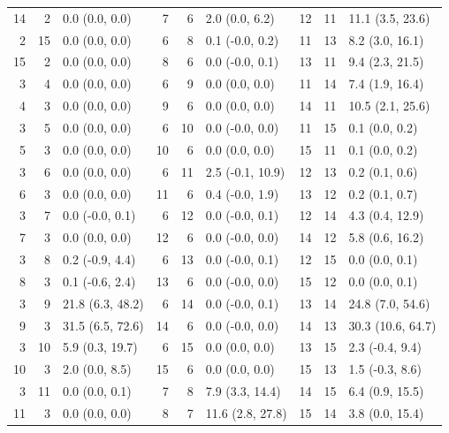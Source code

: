 \begin{table}
\begin{tabular}{|rrl||rrl||rrl|}
      14 &    2 &    0.0 (0.0, 0.0) &    7 &    6 &     2.0 (0.0, 6.2) &   12 &   11 &    11.1 (3.5, 23.6) \\
       2 &   15 &    0.0 (0.0, 0.0) &    6 &    8 &    0.1 (-0.0, 0.2) &   11 &   13 &     8.2 (3.0, 16.1) \\
      15 &    2 &    0.0 (0.0, 0.0) &    8 &    6 &    0.0 (-0.0, 0.1) &   13 &   11 &     9.4 (2.3, 21.5) \\
       3 &    4 &    0.0 (0.0, 0.0) &    6 &    9 &     0.0 (0.0, 0.0) &   11 &   14 &     7.4 (1.9, 16.4) \\
       4 &    3 &    0.0 (0.0, 0.0) &    9 &    6 &     0.0 (0.0, 0.0) &   14 &   11 &    10.5 (2.1, 25.6) \\
       3 &    5 &    0.0 (0.0, 0.0) &    6 &   10 &    0.0 (-0.0, 0.0) &   11 &   15 &      0.1 (0.0, 0.2) \\
       5 &    3 &    0.0 (0.0, 0.0) &   10 &    6 &     0.0 (0.0, 0.0) &   15 &   11 &      0.1 (0.0, 0.2) \\
       3 &    6 &    0.0 (0.0, 0.0) &    6 &   11 &   2.5 (-0.1, 10.9) &   12 &   13 &      0.2 (0.1, 0.6) \\
       6 &    3 &    0.0 (0.0, 0.0) &   11 &    6 &    0.4 (-0.0, 1.9) &   13 &   12 &      0.2 (0.1, 0.7) \\
       3 &    7 &   0.0 (-0.0, 0.1) &    6 &   12 &    0.0 (-0.0, 0.1) &   12 &   14 &     4.3 (0.4, 12.9) \\
       7 &    3 &    0.0 (0.0, 0.0) &   12 &    6 &    0.0 (-0.0, 0.0) &   14 &   12 &     5.8 (0.6, 16.2) \\
       3 &    8 &   0.2 (-0.9, 4.4) &    6 &   13 &    0.0 (-0.0, 0.1) &   12 &   15 &      0.0 (0.0, 0.1) \\
       8 &    3 &   0.1 (-0.6, 2.4) &   13 &    6 &    0.0 (-0.0, 0.0) &   15 &   12 &      0.0 (0.0, 0.1) \\
       3 &    9 &  21.8 (6.3, 48.2) &    6 &   14 &    0.0 (-0.0, 0.1) &   13 &   14 &    24.8 (7.0, 54.6) \\
       9 &    3 &  31.5 (6.5, 72.6) &   14 &    6 &    0.0 (-0.0, 0.0) &   14 &   13 &   30.3 (10.6, 64.7) \\
       3 &   10 &   5.9 (0.3, 19.7) &    6 &   15 &     0.0 (0.0, 0.0) &   13 &   15 &     2.3 (-0.4, 9.4) \\
      10 &    3 &    2.0 (0.0, 8.5) &   15 &    6 &     0.0 (0.0, 0.0) &   15 &   13 &     1.5 (-0.3, 8.6) \\
       3 &   11 &    0.0 (0.0, 0.1) &    7 &    8 &    7.9 (3.3, 14.4) &   14 &   15 &     6.4 (0.9, 15.5) \\
      11 &    3 &    0.0 (0.0, 0.0) &    8 &    7 &   11.6 (2.8, 27.8) &   15 &   14 &     3.8 (0.0, 15.4) \\
    \hline
    \end{tabular}
\end{table}

